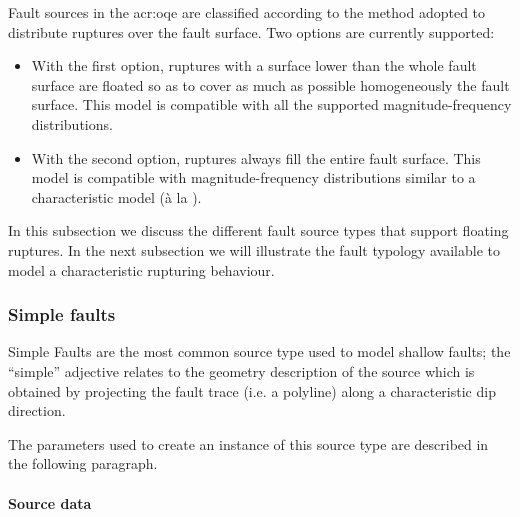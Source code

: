 Fault sources in the \gls{acr:oqe} are classified according to the method
adopted to distribute ruptures over the fault surface. Two options are
currently supported:

\begin{itemize}

    \item With the first option, ruptures with a surface lower than the
    whole fault surface are floated so as to cover as much as possible
    homogeneously the fault surface. This model is compatible with all the
    supported magnitude-frequency distributions.

    \item With the second option, ruptures always fill the entire fault
    surface. This model is compatible with magnitude-frequency
    distributions similar to a characteristic model (\`{a} la
    \cite{schwartz1984}).

\end{itemize}

In this subsection we discuss the different fault source types that
support floating ruptures. In the next subsection we will illustrate the fault
typology available to model a characteristic rupturing behaviour.



\subsubsection{Simple faults}

Simple Faults are the most common source type used to model shallow faults;
the ``simple'' adjective relates to the geometry description of the source
which is obtained by projecting the fault trace (i.e. a polyline) along a
characteristic dip direction.

The parameters used to create an instance of this source type are described
in the following paragraph.

\paragraph{Source data}

